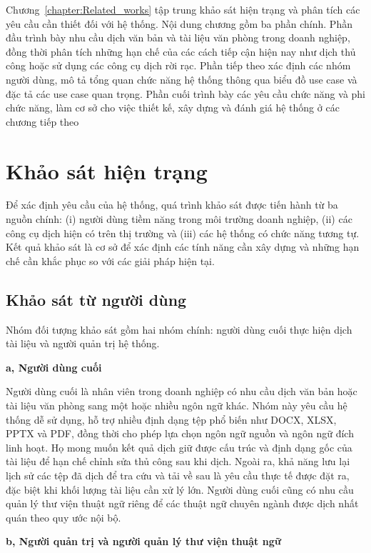 \documentclass[../DoAn.tex]{subfiles}
\begin{document}
 Chương~\ref{chapter:Related_works} tập trung khảo sát hiện trạng và phân tích các yêu cầu cần thiết đối với hệ thống. Nội dung chương gồm ba phần chính. Phần đầu trình bày nhu cầu dịch văn bản và tài liệu văn phòng trong doanh nghiệp, đồng thời phân tích những hạn chế của các cách tiếp cận hiện nay như dịch thủ công hoặc sử dụng các công cụ dịch rời rạc. Phần tiếp theo xác định các nhóm người dùng, mô tả tổng quan chức năng hệ thống thông qua biểu đồ use case và đặc tả các use case quan trọng. Phần cuối trình bày các yêu cầu chức năng và phi chức năng, làm cơ sở cho việc thiết kế, xây dựng và đánh giá hệ thống ở các chương tiếp theo

\section{Khảo sát hiện trạng}
\label{section:2.1}
Để xác định yêu cầu của hệ thống, quá trình khảo sát được tiến hành từ ba nguồn chính: (i) người dùng tiềm năng trong môi trường doanh nghiệp, (ii) các công cụ dịch hiện có trên thị trường và (iii) các hệ thống có chức năng tương tự. Kết quả khảo sát là cơ sở để xác định các tính năng cần xây dựng và những hạn chế cần khắc phục so với các giải pháp hiện tại.

\subsection{Khảo sát từ người dùng}
\label{subsection:2.1.1}

Nhóm đối tượng khảo sát gồm hai nhóm chính: người dùng cuối thực hiện dịch tài liệu và người quản trị hệ thống.

\textbf{a, Người dùng cuối}

Người dùng cuối là nhân viên trong doanh nghiệp có nhu cầu dịch văn bản hoặc tài liệu văn phòng sang một hoặc nhiều ngôn ngữ khác. Nhóm này yêu cầu hệ thống dễ sử dụng, hỗ trợ nhiều định dạng tệp phổ biến như DOCX, XLSX, PPTX và PDF, đồng thời cho phép lựa chọn ngôn ngữ nguồn và ngôn ngữ đích linh hoạt. Họ mong muốn kết quả dịch giữ được cấu trúc và định dạng gốc của tài liệu để hạn chế chỉnh sửa thủ công sau khi dịch. Ngoài ra, khả năng lưu lại lịch sử các tệp đã dịch để tra cứu và tải về sau là yêu cầu thực tế được đặt ra, đặc biệt khi khối lượng tài liệu cần xử lý lớn. Người dùng cuối cũng có nhu cầu quản lý thư viện thuật ngữ riêng để các thuật ngữ chuyên ngành được dịch nhất quán theo quy ước nội bộ.

\textbf{b, Người quản trị và người quản lý thư viện thuật ngữ}
\end{document}
